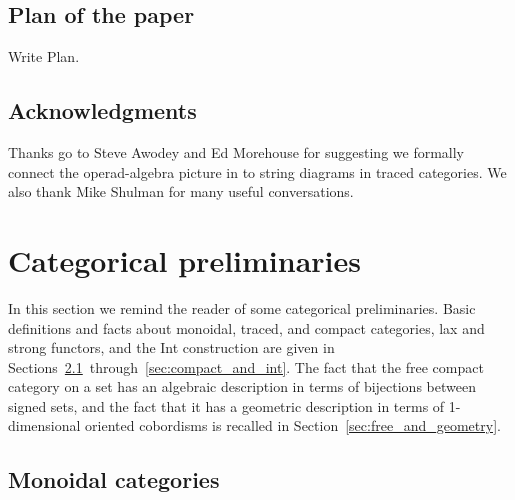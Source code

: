 \documentclass[12pt,oneside,article,draft]{memoir}
\begin{document}
\section{Plan of the paper} 

Write Plan.

\section*{Acknowledgments}

Thanks go to Steve Awodey and Ed Morehouse for suggesting we formally connect the operad-algebra
picture in \cite{RupelSpivak} to string diagrams in traced categories. We also thank Mike Shulman for many useful conversations.

\chapter{Categorical preliminaries}\label{sec:traced categories}

In this section we remind the reader of some categorical preliminaries. Basic definitions and facts
about monoidal, traced, and compact categories, lax and strong functors, and the Int construction
are given in Sections~\ref{sec:prelim_monoidal}~through~\ref{sec:compact_and_int}. The fact that
the free compact category on a set has an algebraic description in terms of bijections between
signed sets, and the fact that it has a geometric description in terms of 1-dimensional oriented
cobordisms is recalled in Section~\ref{sec:free_and_geometry}. 

\section{Monoidal categories}\label{sec:prelim_monoidal}
\end{document}
